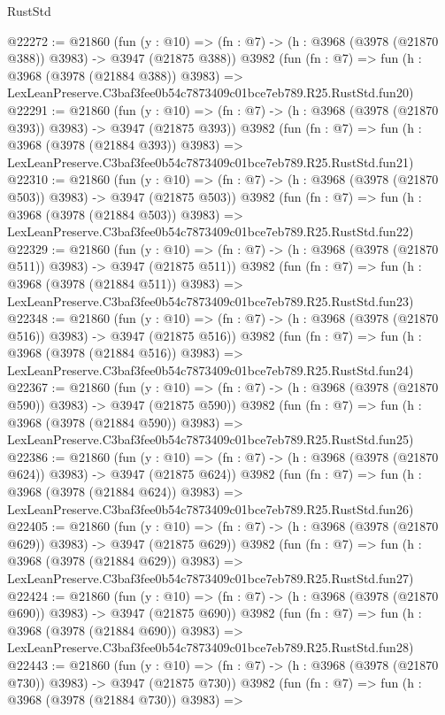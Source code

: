 \begin{lexlean}{RustStd}
\begin{coremodule}
@22272 := @21860
    (fun (y : @10) => (fn : @7) -> (h : @3968 (@3978 (@21870 @388)) @3983) -> @3947 (@21875 @388))
    @3982
    (fun (fn : @7) =>
    fun (h : @3968 (@3978 (@21884 @388)) @3983) =>
    LexLeanPreserve.C3baf3fee0b54c7873409c01bce7eb789.R25.RustStd.fun20)
@22291 := @21860
    (fun (y : @10) => (fn : @7) -> (h : @3968 (@3978 (@21870 @393)) @3983) -> @3947 (@21875 @393))
    @3982
    (fun (fn : @7) =>
    fun (h : @3968 (@3978 (@21884 @393)) @3983) =>
    LexLeanPreserve.C3baf3fee0b54c7873409c01bce7eb789.R25.RustStd.fun21)
@22310 := @21860
    (fun (y : @10) => (fn : @7) -> (h : @3968 (@3978 (@21870 @503)) @3983) -> @3947 (@21875 @503))
    @3982
    (fun (fn : @7) =>
    fun (h : @3968 (@3978 (@21884 @503)) @3983) =>
    LexLeanPreserve.C3baf3fee0b54c7873409c01bce7eb789.R25.RustStd.fun22)
@22329 := @21860
    (fun (y : @10) => (fn : @7) -> (h : @3968 (@3978 (@21870 @511)) @3983) -> @3947 (@21875 @511))
    @3982
    (fun (fn : @7) =>
    fun (h : @3968 (@3978 (@21884 @511)) @3983) =>
    LexLeanPreserve.C3baf3fee0b54c7873409c01bce7eb789.R25.RustStd.fun23)
@22348 := @21860
    (fun (y : @10) => (fn : @7) -> (h : @3968 (@3978 (@21870 @516)) @3983) -> @3947 (@21875 @516))
    @3982
    (fun (fn : @7) =>
    fun (h : @3968 (@3978 (@21884 @516)) @3983) =>
    LexLeanPreserve.C3baf3fee0b54c7873409c01bce7eb789.R25.RustStd.fun24)
@22367 := @21860
    (fun (y : @10) => (fn : @7) -> (h : @3968 (@3978 (@21870 @590)) @3983) -> @3947 (@21875 @590))
    @3982
    (fun (fn : @7) =>
    fun (h : @3968 (@3978 (@21884 @590)) @3983) =>
    LexLeanPreserve.C3baf3fee0b54c7873409c01bce7eb789.R25.RustStd.fun25)
@22386 := @21860
    (fun (y : @10) => (fn : @7) -> (h : @3968 (@3978 (@21870 @624)) @3983) -> @3947 (@21875 @624))
    @3982
    (fun (fn : @7) =>
    fun (h : @3968 (@3978 (@21884 @624)) @3983) =>
    LexLeanPreserve.C3baf3fee0b54c7873409c01bce7eb789.R25.RustStd.fun26)
@22405 := @21860
    (fun (y : @10) => (fn : @7) -> (h : @3968 (@3978 (@21870 @629)) @3983) -> @3947 (@21875 @629))
    @3982
    (fun (fn : @7) =>
    fun (h : @3968 (@3978 (@21884 @629)) @3983) =>
    LexLeanPreserve.C3baf3fee0b54c7873409c01bce7eb789.R25.RustStd.fun27)
@22424 := @21860
    (fun (y : @10) => (fn : @7) -> (h : @3968 (@3978 (@21870 @690)) @3983) -> @3947 (@21875 @690))
    @3982
    (fun (fn : @7) =>
    fun (h : @3968 (@3978 (@21884 @690)) @3983) =>
    LexLeanPreserve.C3baf3fee0b54c7873409c01bce7eb789.R25.RustStd.fun28)
@22443 := @21860
    (fun (y : @10) => (fn : @7) -> (h : @3968 (@3978 (@21870 @730)) @3983) -> @3947 (@21875 @730))
    @3982
    (fun (fn : @7) =>
    fun (h : @3968 (@3978 (@21884 @730)) @3983) =>

\end{coremodule}
\end{lexlean}
